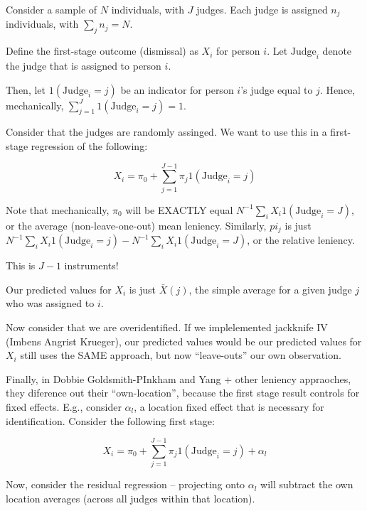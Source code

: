 



Consider a sample of $N$ individuals, with $J$ judges. Each judge is assigned $n_{j}$ individuals, with $\sum_{j}n_{j} = N$.

Define the first-stage outcome (dismissal) as $X_{i}$ for person
$i$. Let $\text{Judge}_{i}$ denote the judge that is assigned to
person $i$.

Then, let $1(\text{Judge}_{i} = j)$ be an indicator for person $i$'s
judge equal to $j$. Hence, mechanically,
$\sum_{j=1}^{J}1(\text{Judge}_{i} = j) = 1$.

Consider that the judges are randomly assinged. We want to use this in a first-stage regression of the following:

\begin{equation}
  X_{i} = \pi_{0} + \sum_{j=1}^{J-1}\pi_{j}1(\text{Judge}_{i} = j)
\end{equation}

Note that mechanically, $\pi_{0}$ will be EXACTLY equal
$N^{-1}\sum_{i}X_{i}1(\text{Judge}_{i} = J)$, or the average
(non-leave-one-out) mean leniency. Similarly, $pi_{j}$ is just
$N^{-1}\sum_{i}X_{i}1(\text{Judge}_{i} = j) -
N^{-1}\sum_{i}X_{i}1(\text{Judge}_{i} = J)$, or the relative leniency.

This is $J-1$ instruments!

Our predicted values for $X_{i}$ is just $\bar{X}(j)$, the simple average for a given judge $j$ who was assigned to $i$.

Now consider that we are overidentified. If we implelemented jackknife IV (Imbens Angrist Krueger), our predicted values would be our predicted values for $X_{i}$ still uses the SAME approach, but now ``leave-outs'' our own observation.

Finally, in Dobbie Goldsmith-PInkham and Yang + other leniency appraoches, they diference out their ``own-location'', because the first stage result controls for fixed effects. E.g., consider $\alpha_{l}$, a location fixed effect that is necessary for identification. Consider the following first stage:

\begin{equation}
  X_{i} = \pi_{0} + \sum_{j=1}^{J-1}\pi_{j}1(\text{Judge}_{i} = j) + \alpha_{l}
\end{equation}

Now, consider the residual regression -- projecting onto $\alpha_{l}$
will subtract the own location averages (across all judges within that location).



